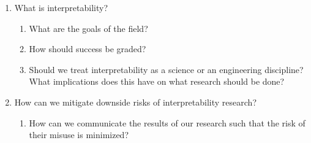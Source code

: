\begin{enumerate}
    \item What is interpretability?
    \begin{enumerate}[label=\alph*.]
        \item What are the goals of the field?
        \item How should success be graded?
        \item Should we treat interpretability as a science or an engineering discipline? What implications does this have on what research should be done?
    \end{enumerate}
    
    \item How can we mitigate downside risks of interpretability research?
    \begin{enumerate}[label=\alph*.]
        \item How can we communicate the results of our research such that the risk of their misuse is minimized?
    \end{enumerate}
\end{enumerate}